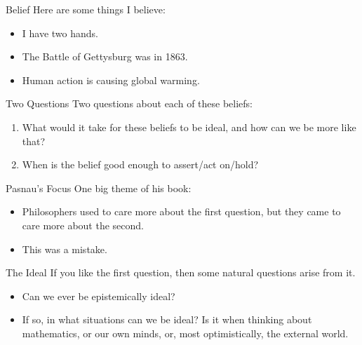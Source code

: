 \documentclass[
  17pt,
  letterpaper,
  ignorenonframetext,
  aspectratio=169,
  handout]{beamer}
\providecommand{\tightlist}{%
  \setlength{\itemsep}{0pt}\setlength{\parskip}{0pt}}\usepackage{longtable,booktabs,array}
\begin{document}
\begin{frame}{Belief}
\protect\hypertarget{belief}{}
Here are some things I believe: \pause

\begin{itemize}[<+->]
\tightlist
\item
  I have two hands.
\item
  The Battle of Gettysburg was in 1863.
\item
  Human action is causing global warming.
\end{itemize}
\end{frame}

\begin{frame}{Two Questions}
\protect\hypertarget{two-questions}{}
Two questions about each of these beliefs: \pause

\begin{enumerate}[<+->]
\tightlist
\item
  What would it take for these beliefs to be ideal, and how can we be
  more like that?
\item
  When is the belief good enough to assert/act on/hold?
\end{enumerate}
\end{frame}

\begin{frame}{Pasnau's Focus}
\protect\hypertarget{pasnaus-focus}{}
One big theme of his book:

\begin{itemize}[<+->]
\tightlist
\item
  Philosophers used to care more about the first question, but they came
  to care more about the second.
\item
  This was a mistake.
\end{itemize}
\end{frame}

\begin{frame}{The Ideal}
\protect\hypertarget{the-ideal}{}
If you like the first question, then some natural questions arise from
it.

\begin{itemize}[<+->]
\tightlist
\item
  Can we ever be epistemically ideal?
\item
  If so, in what situations can we be ideal? Is it when thinking about
  mathematics, or our own minds, or, most optimistically, the external
  world.
\end{itemize}
\end{frame}
\end{document}
